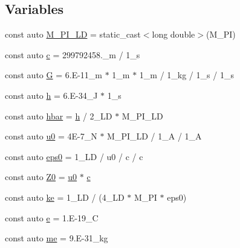 \subsection*{Variables}
\begin{DoxyCompactItemize}
\item 
const auto \hyperlink{namespaceboost_1_1units_1_1constants_a14415c6082722a7b15c191a15f513b40}{M\+\_\+\+P\+I\+\_\+\+LD} = static\+\_\+cast$<$long double$>$(M\+\_\+\+PI)
\item 
const auto \hyperlink{namespaceboost_1_1units_1_1constants_a1e4c07de84b2d43e7717eaada50b32de}{c} = 299792458.\+\_\+m / 1\+\_\+s
\item 
const auto \hyperlink{namespaceboost_1_1units_1_1constants_abeab95597a02e0f0bccbd005fd8cb968}{G} = 6.\+E-\/11\+\_\+m $\ast$ 1\+\_\+m $\ast$ 1\+\_\+m / 1\+\_\+kg / 1\+\_\+s / 1\+\_\+s
\item 
const auto \hyperlink{namespaceboost_1_1units_1_1constants_a744f5a50efb6701fcbde9527affd7776}{h} = 6.\+E-\/34\+\_\+\+J $\ast$ 1\+\_\+s
\item 
const auto \hyperlink{namespaceboost_1_1units_1_1constants_a0203c96d139e639b8ee536cbc010c7bd}{hbar} = \hyperlink{namespaceboost_1_1units_1_1constants_a744f5a50efb6701fcbde9527affd7776}{h} / 2\+\_\+\+L\+D $\ast$ M\+\_\+\+P\+I\+\_\+\+LD
\item 
const auto \hyperlink{namespaceboost_1_1units_1_1constants_a18461397bf032da161b03588a4ee3db9}{u0} = 4\+E-\/7\+\_\+\+N $\ast$ M\+\_\+\+P\+I\+\_\+\+L\+D / 1\+\_\+\+A / 1\+\_\+A
\item 
const auto \hyperlink{namespaceboost_1_1units_1_1constants_a7418381307037e971ba8770ccffdf204}{eps0} = 1\+\_\+\+L\+D / u0 / c / c
\item 
const auto \hyperlink{namespaceboost_1_1units_1_1constants_a292ef44e5770a42d75796bef0fb74c73}{Z0} = \hyperlink{namespaceboost_1_1units_1_1constants_a18461397bf032da161b03588a4ee3db9}{u0} $\ast$ \hyperlink{namespaceboost_1_1units_1_1constants_a1e4c07de84b2d43e7717eaada50b32de}{c}
\item 
const auto \hyperlink{namespaceboost_1_1units_1_1constants_a2839705cdb6a3b2a7e9ab4c6967fab23}{ke} = 1\+\_\+\+L\+D / (4\+\_\+\+L\+D $\ast$ M\+\_\+\+P\+I $\ast$ eps0)
\item 
const auto \hyperlink{namespaceboost_1_1units_1_1constants_a0e10024b337b34c7f7300c67f0e9fcb1}{e} = 1.\+E-\/19\+\_\+C
\item 
const auto \hyperlink{namespaceboost_1_1units_1_1constants_ae2a04958a1975830e160ad479847dc3c}{me} = 9.\+E-\/31\+\_\+kg

\end{DoxyCompactItemize}
